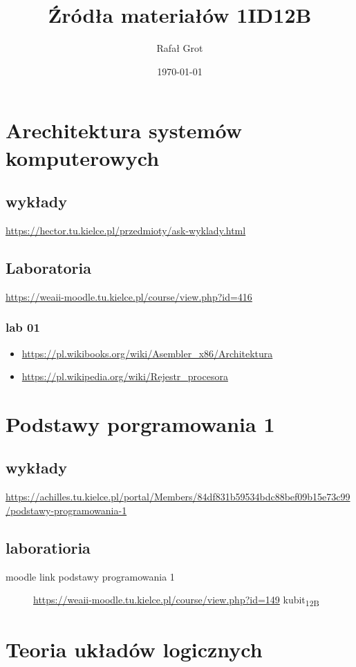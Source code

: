 \documentclass[11pt]{article}
\author{Rafał Grot}
\date{\today}
\title{Źródła materiałów 1ID12B}
\begin{document}
\maketitle
\tableofcontents


\section{Arechitektura systemów komputerowych}
\label{sec:org1443b0a}
\subsection{wykłady}
\label{sec:orgc4c61a3}
\url{https://hector.tu.kielce.pl/przedmioty/ask-wyklady.html}
\subsection{Laboratoria}
\label{sec:org48ac42d}
\url{https://weaii-moodle.tu.kielce.pl/course/view.php?id=416}
\subsubsection{lab 01}
\label{sec:org9966471}
\begin{itemize}
\item \url{https://pl.wikibooks.org/wiki/Asembler\_x86/Architektura}
\item \url{https://pl.wikipedia.org/wiki/Rejestr\_procesora}
\end{itemize}
\section{Podstawy porgramowania 1}
\label{sec:org3e925df}
\subsection{wykłady}
\label{sec:org02dccdd}
\url{https://achilles.tu.kielce.pl/portal/Members/84df831b59534bdc88bef09b15e73c99/podstawy-programowania-1}
\subsection{laboratioria}
\label{sec:org8a81136}
\begin{description}
\item[{moodle link podstawy programowania 1}] \url{https://weaii-moodle.tu.kielce.pl/course/view.php?id=149} kubit\textsubscript{12B}
\end{description}
\section{Teoria układów logicznych}
\label{sec:org41795d8}
\end{document}
